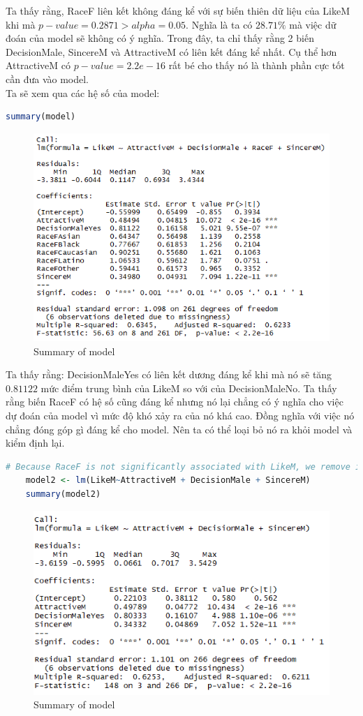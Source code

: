 \documentclass[a4paper,12pt]{article}
\begin{document}
	Ta thấy rằng, RaceF liên kết không đáng kể với sự biến thiên dữ liệu của LikeM khi mà $p-value = 0.2871 > alpha = 0.05$. Nghĩa là ta có $28.71\%$ mà việc dữ đoán của model sẽ không có ý nghĩa. Trong đây, ta chỉ thấy rằng 2 biến DecisionMale, SincereM và AttractiveM có liên kết đáng kể nhất. Cụ thể hơn AttractiveM có $p-value = 2.2e-16$ rất bé cho thấy nó là thành phần cực tốt cần đưa vào model.\\
	
	Ta sẽ xem qua các hệ số của model:
	\begin{lstlisting}[language=R]
	summary(model)
	\end{lstlisting}
	
	\begin{figure}[H]
		\centering
		\includegraphics[width=0.7\linewidth]{sum1}
		\caption{Summary of model}
		\label{fig:sum1}
	\end{figure}
	
	Ta thấy rằng: DecisionMaleYes có liên kết dương đáng kể khi mà nó sẽ tăng $0.81122$ mức điểm trung bình của LikeM so với của DecisionMaleNo. Ta thấy rằng biến RaceF có hệ số cũng đáng kể nhưng nó lại chẳng có ý nghĩa cho việc dự đoán của model vì mức độ khó xảy ra của nó khá cao. Đồng nghĩa với việc nó chẳng đóng góp gì đáng kể cho model. Nên ta có thể loại bỏ nó ra khỏi model và kiểm định lại.
	
	\begin{lstlisting}[language=R]
	# Because RaceF is not significantly associated with LikeM, we remove it
	model2 <- lm(LikeM~AttractiveM + DecisionMale + SincereM)
	summary(model2)
	\end{lstlisting}
	
	\begin{figure}[H]
		\centering
		\includegraphics[width=0.7\linewidth]{sum2}
		\caption{Summary of model}
		\label{fig:sum2}
	\end{figure}
	 
\end{document}

